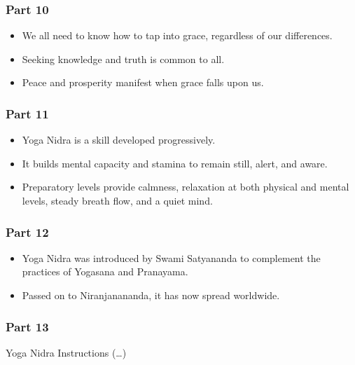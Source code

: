 \begin{frame}[fragile]\frametitle{Part 10}

\begin{itemize}
    \item We all need to know how to tap into grace, regardless of our differences.
    \item Seeking knowledge and truth is common to all.
    \item Peace and prosperity manifest when grace falls upon us.
\end{itemize}

\end{frame}

\begin{frame}[fragile]\frametitle{Part 11}

\begin{itemize}
    \item Yoga Nidra is a skill developed progressively.
    \item It builds mental capacity and stamina to remain still, alert, and aware.
    \item Preparatory levels provide calmness, relaxation at both physical and mental levels, steady breath flow, and a quiet mind.
\end{itemize}

\end{frame}

\begin{frame}[fragile]\frametitle{Part 12}

\begin{itemize}
    \item Yoga Nidra was introduced by Swami Satyananda to complement the practices of Yogasana and Pranayama.
    \item Passed on to Niranjanananda, it has now spread worldwide.
\end{itemize}

\end{frame}

\begin{frame}[fragile]\frametitle{Part 13}

Yoga Nidra Instructions (\ldots)

\end{frame}

